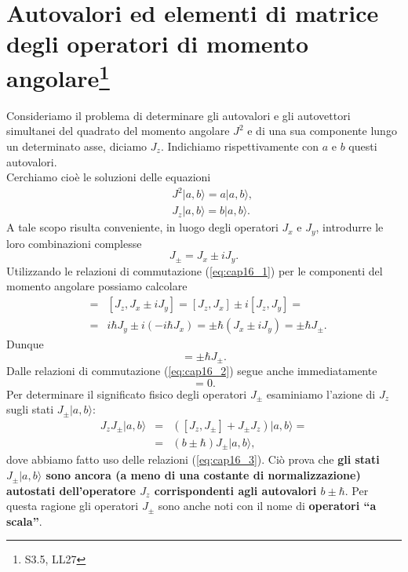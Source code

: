 \documentclass[a4paper,12pt,oneside]{book}
\begin{document}
\section[Autovalori ed elementi di matrice degli operatori di momento angolare]{Autovalori ed elementi di matrice degli operatori di momento angolare\footnote{S3.5, LL27}}
Consideriamo il problema di determinare gli autovalori e gli autovettori simultanei del quadrato del momento angolare $J^2$ e di una sua componente lungo un determinato asse, diciamo $J_z$. Indichiamo rispettivamente con $a$ e $b$ questi autovalori.\\
Cerchiamo cioè le soluzioni delle equazioni
\begin{eqnarray}
& &J^2 \vert a, b \rangle = a \vert a, b \rangle , \\
& &J_z \vert a, b \rangle = b \vert a, b \rangle .
\end{eqnarray}
A tale scopo risulta conveniente, in luogo degli operatori $J_x$ e $J_y$, introdurre le loro combinazioni complesse
\begin{equation}
J_{\pm} = J_x \pm i J_y .
\end{equation}
Utilizzando le relazioni di commutazione (\ref{eq:cap16_1}) per le componenti del momento angolare possiamo calcolare
\begin{eqnarray}
[J_z , J_{\pm}] & = & [J_z , J_x \pm i J_y] = [J_z , J_x] \pm i [J_z ,J_y] = \nonumber \\
& = & i\hbar J_y \pm i (-i\hbar J_x) = \pm \hbar (J_x \pm i J_y ) = \pm \hbar J_{\pm} .
\end{eqnarray}
Dunque
\begin{equation}
[J_z , J_{\pm}] = \pm \hbar J_{\pm} .
\label{eq:cap16_3}
\end{equation}
Dalle relazioni di commutazione (\ref{eq:cap16_2}) segue anche immediatamente
\begin{equation}
[J^2 , J_{\pm}]=0 .
\label{eq:cap16_4}
\end{equation}
Per determinare il significato fisico degli operatori $J_{\pm}$ esaminiamo l'azione di $J_z$ sugli stati $J_{\pm} \vert a, b \rangle$:
\begin{eqnarray}
J_zJ_{\pm} \vert a, b \rangle & =& \left( [J_z,J_{\pm}] + J_{\pm}J_{z}\right)\vert a, b \rangle = \nonumber \\
&=& (b \pm \hbar )J_{\pm} \vert a, b \rangle , 
\end{eqnarray}
dove abbiamo fatto uso delle relazioni (\ref{eq:cap16_3}). Ciò prova che \textbf{gli stati $ J_{\pm} \vert a, b \rangle$ sono ancora (a meno di una costante di normalizzazione) autostati dell'operatore $J_z$ corrispondenti agli autovalori $b\pm \hbar$}. Per questa ragione gli operatori $J_{\pm}$ sono anche noti con il nome di \textbf{operatori ``a scala''}.\\
\end{document}
